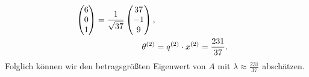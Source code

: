 \documentclass{exercise}
\begin{document}
\begin{enumerate}
\begin{align*}
\begin{pmatrix}
				6\\
				0\\
				1
			\end{pmatrix} = \frac{1}{\sqrt{37}}\begin{pmatrix}
				37\\
				-1\\
				9
			\end{pmatrix},\\
			\theta^{\parentheses*{2}} &= q^{\parentheses*{2}} \cdot x^{\parentheses*{2}} = \frac{231}{37}.
		\end{align*}
		Folglich können wir den betragsgrößten Eigenwert von \(A\) mit \(\lambda \approx \frac{231}{37}\) abschätzen.
	\end{enumerate}		
\end{document}
